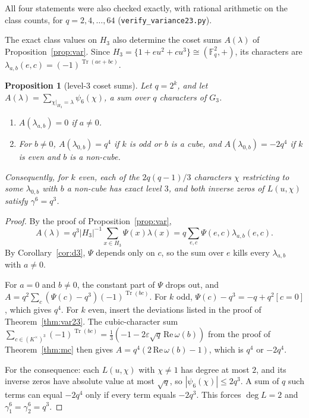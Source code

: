 \documentclass[11pt,a4paper]{amsart}
\newtheorem{proposition}[theorem]{Proposition}
\theoremstyle{definition}
\theoremstyle{remark}
\newcommand{\F}{\mathbb{F}}
\newcommand{\Tr}{\operatorname{Tr}}
\begin{document}
All four statements were also checked exactly, with rational arithmetic on the class counts, for
$q=2,4,\dots,64$ (\texttt{verify\_variance23.py}).

The exact class values on $H_3$ also determine the coset sums $A(\lambda)$ of Proposition~\ref{prop:var}. Since
$H_3=\{1+eu^2+cu^3\}\cong(\F_q^2,+)$, its characters are $\lambda_{a,b}(e,c)=(-1)^{\Tr(ae+bc)}$.

\begin{proposition}[level-$3$ coset sums]\label{prop:level3}
Let $q=2^k$, and let $A(\lambda)=\sum_{\chi|_{H_3}=\lambda}\psi_6(\chi)$, a sum over $q$ characters of $G_3$.
\begin{enumerate}
\item $A(\lambda_{a,b})=0$ if $a\ne0$.
\item For $b\ne0$, $A(\lambda_{0,b})=q^4$ if $k$ is odd or $b$ is a cube, and $A(\lambda_{0,b})=-2q^4$ if $k$ is even
and $b$ is a non-cube.
\end{enumerate}
Consequently, for $k$ even, each of the $2q(q-1)/3$ characters $\chi$ restricting to some $\lambda_{0,b}$ with $b$ a
non-cube has exact level $3$, and both inverse zeros of $L(u,\chi)$ satisfy $\gamma^6=q^3$.
\end{proposition}

\begin{proof}
By the proof of Proposition~\ref{prop:var},
\[
A(\lambda)=q^3|H_3|^{-1}\sum_{x\in H_3}\Psi(x)\lambda(x)=q\sum_{e,c}\Psi(e,c)\lambda_{a,b}(e,c).
\]
By
Corollary~\ref{cor:d3}, $\Psi$ depends only on $c$, so the sum over $e$ kills every $\lambda_{a,b}$ with $a\ne0$.

For $a=0$ and $b\ne0$, the constant part of $\Psi$ drops out, and $A=q^2\sum_c(\Psi(c)-q^3)(-1)^{\Tr(bc)}$. For $k$
odd, $\Psi(c)-q^3=-q+q^2[c=0]$, which gives $q^4$. For $k$ even, insert the deviations listed in the proof of
Theorem~\ref{thm:var23}. The cubic-character sum
$\sum_{c\in(K^\times)^3}(-1)^{\Tr(bc)}=\frac13(-1-2\varepsilon\sqrt q\,\mathrm{Re}\,\omega(b))$ from the proof of
Theorem~\ref{thm:mc} then gives $A=q^4(2\,\mathrm{Re}\,\omega(b)-1)$, which is $q^4$ or $-2q^4$.

For the consequence: each $L(u,\chi)$ with $\chi\ne1$ has degree at most $2$, and its inverse zeros have absolute
value at most $\sqrt q$, so $|\psi_6(\chi)|\le2q^3$. A sum of $q$ such terms can equal $-2q^4$ only if every term
equals $-2q^3$. This forces $\deg L=2$ and $\gamma_1^6=\gamma_2^6=q^3$.
\end{proof}
\end{document}
